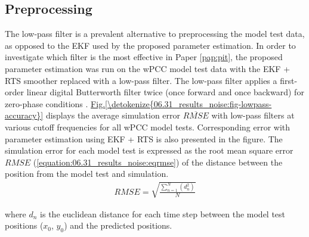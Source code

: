 \subsection{Preprocessing}
\label{\detokenize{06.31_results_noise:preprocessing}}\label{\detokenize{06.31_results_noise::doc}}

The low-pass filter is a prevalent alternative to preprocessing the model test data, as opposed to the EKF used by the proposed parameter estimation.
In order to investigate which filter is the most effective in Paper \ref{pap:pit}, the proposed parameter estimation was run on the wPCC model test data with the EKF + RTS smoother replaced with a low-pass filter. The low-pass filter applies a first-order linear digital Butterworth filter twice (once forward and once backward) for zero-phase conditions \cite{virtanen_scipy_2020}. \hyperref[\detokenize{06.31_results_noise:fig-lowpass-accuracy}]{Fig.\@ \ref{\detokenize{06.31_results_noise:fig-lowpass-accuracy}}} displays the average simulation error \( \overline{RMSE} \) with low-pass filters at various cutoff frequencies for all wPCC model tests. Corresponding error with parameter estimation using EKF + RTS is also presented in the figure. The simulation error for each model test is expressed as the root mean square error \(RMSE\) (\autoref{equation:06.31_results_noise:eqrmse}) of the distance between the position from the model test and simulation.
\begin{equation}\label{equation:06.31_results_noise:eqrmse}
\begin{split}RMSE=\sqrt{ \frac{\sum_{n=1}^{N} (d_n^2) }{N}} \end{split}
\end{equation}

\noindent where \(d_n\) is the euclidean distance for each time step between the model test positions (\(x_0\), \(y_0\)) and the predicted positions.

